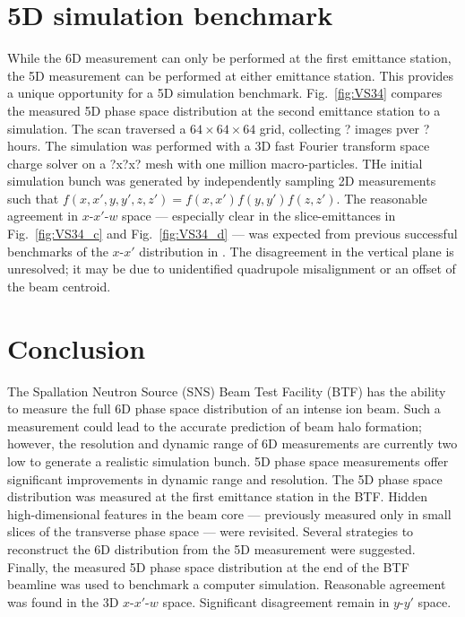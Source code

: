 \documentclass[letterpaper,
               keeplastbox,
               nospread,
               biblatex,
              ]{jacow}
\begin{document}
\section{5D simulation benchmark}

While the 6D measurement can only be performed at the first emittance station, the 5D measurement can be performed at either emittance station. This provides a unique opportunity for a 5D simulation benchmark. Fig.~\ref{fig:VS34} compares the measured 5D phase space distribution at the second emittance station to a simulation. The scan traversed a $64 \times 64 \times 64$ grid, collecting ? images pver ? hours. The simulation was performed with a 3D fast Fourier transform space charge solver on a ?x?x? mesh with one million macro-particles. THe initial simulation bunch was generated by independently sampling 2D measurements such that $f(x,x',y,y',z,z') = f(x,x')f(y,y')f(z,z')$. The reasonable agreement in $x$-$x'$-$w$ space — especially clear in the slice-emittances in Fig.~\ref{fig:VS34_c} and Fig.~\ref{fig:VS34_d} — was expected from previous successful benchmarks of the $x$-$x'$ distribution in \cite{Ruisard2021-IPAC}. The disagreement in the vertical plane is unresolved; it may be due to unidentified quadrupole misalignment or an offset of the beam centroid.



\section{Conclusion}

The Spallation Neutron Source (SNS) Beam Test Facility (BTF) has the ability to measure the full 6D phase space distribution of an intense ion beam. Such a measurement could lead to the accurate prediction of beam halo formation; however, the resolution and dynamic range of 6D measurements are currently two low to generate a realistic simulation bunch. 5D phase space measurements offer significant improvements in dynamic range and resolution. The 5D phase space distribution was measured at the first emittance station in the BTF. Hidden high-dimensional features in the beam core — previously measured only in small slices of the transverse phase space — were revisited. Several strategies to reconstruct the 6D distribution from the 5D measurement were suggested. Finally, the measured 5D phase space distribution at the end of the BTF beamline was used to benchmark a computer simulation. Reasonable agreement was found in the 3D $x$-$x'$-$w$ space. Significant disagreement remain in $y$-$y'$ space.
\end{document}
